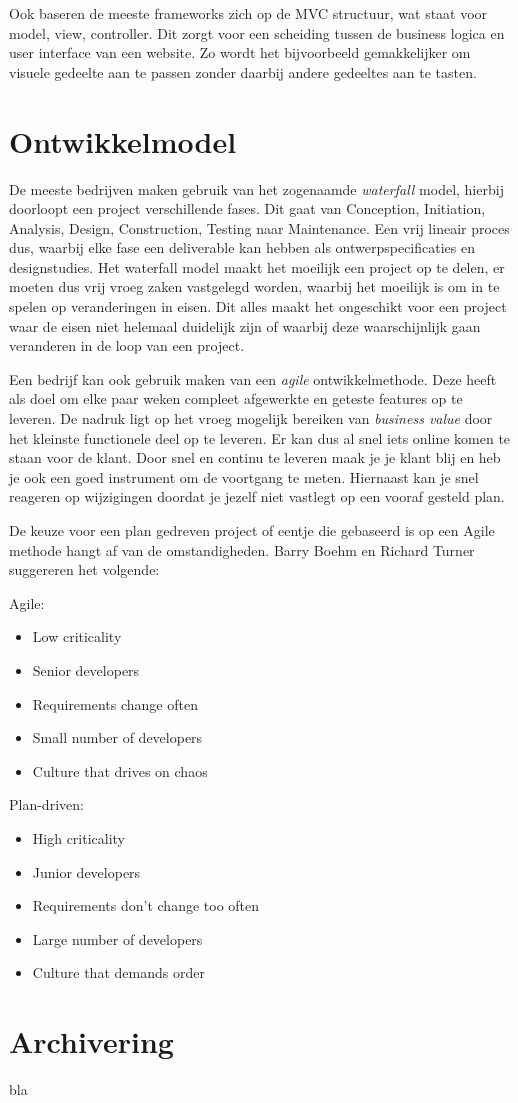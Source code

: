 \documentclass[12pt, a4paper]{article}
\begin{document}
Ook baseren de meeste frameworks zich op de MVC structuur, wat staat voor model, view, controller. Dit zorgt voor een scheiding tussen de business logica en user interface van een website. Zo wordt het bijvoorbeeld gemakkelijker om visuele gedeelte aan te passen zonder daarbij andere gedeeltes aan te tasten.

\section{Ontwikkelmodel}

De meeste bedrijven maken gebruik van het zogenaamde \emph{waterfall} model, hierbij doorloopt een project verschillende fases. Dit gaat van Conception, Initiation, Analysis, Design, Construction, Testing naar Maintenance. Een vrij lineair proces dus, waarbij elke fase een deliverable kan hebben als ontwerpspecificaties en designstudies. Het waterfall model maakt het moeilijk een project op te delen, er moeten dus vrij vroeg zaken vastgelegd worden, waarbij het moeilijk is om in te spelen op veranderingen in eisen. Dit alles maakt het ongeschikt voor een project waar de eisen niet helemaal duidelijk zijn of waarbij deze waarschijnlijk gaan veranderen in de loop van een project.

Een bedrijf kan ook gebruik maken van een \emph{agile} ontwikkelmethode. Deze heeft als doel om elke paar weken compleet afgewerkte en geteste features op te leveren. De nadruk ligt op het vroeg mogelijk bereiken van \emph{business value} door het kleinste functionele deel op te leveren. Er kan dus al snel iets online komen te staan voor de klant. Door snel en continu te leveren maak je je klant blij en heb je ook een goed instrument om de voortgang te meten. Hiernaast kan je snel reageren op wijzigingen doordat je jezelf niet vastlegt op een vooraf gesteld plan.

De keuze voor een plan gedreven project of eentje die gebaseerd is op een Agile methode hangt af van de omstandigheden. Barry Boehm en Richard Turner\cite{agilebook} suggereren het volgende:

Agile:
\begin{itemize}
  \item Low criticality
  \item Senior developers
  \item Requirements change often
  \item Small number of developers
  \item Culture that drives on chaos
\end{itemize}

Plan-driven:
\begin{itemize}
  \item High criticality
  \item Junior developers
  \item Requirements don't change too often
  \item Large number of developers
  \item Culture that demands order
\end{itemize}



\section{Archivering}

bla




\end{document}
